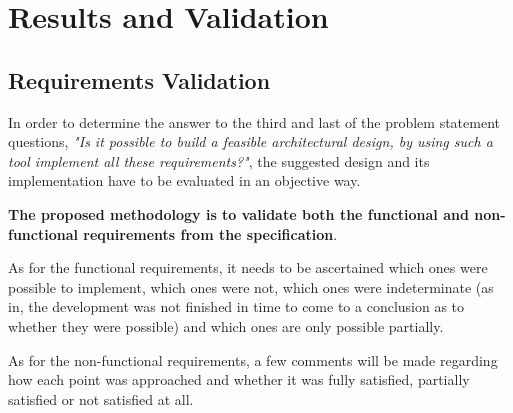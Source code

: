 \section{Results and Validation}
\label{sec:results-validation}

\subsection{Requirements Validation}
In order to determine the answer to the third and last of the problem statement questions, \textit{"Is it possible to build a feasible architectural design, by using such a tool implement all these requirements?"}, the suggested design and its implementation have to be evaluated in an objective way. 

\textbf{The proposed methodology is to validate both the functional and non-functional requirements from the specification}. 

As for the functional requirements, it needs to be ascertained which ones were possible to implement, which ones were not, which ones were indeterminate (as in, the development was not finished in time to come to a conclusion as to whether they were possible) and which ones are only possible partially. %

As for the non-functional requirements, a few comments will be made regarding how each point was approached and whether it was fully satisfied, partially satisfied or not satisfied at all.

